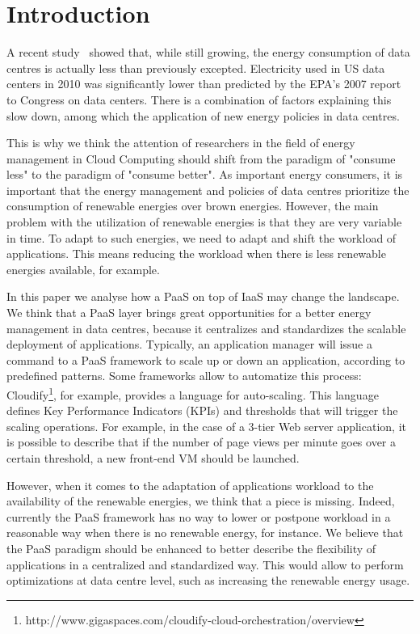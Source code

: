 \section{Introduction}
\label{sec: intro}

A recent study~\cite{koomey2011} showed that, while still growing, the energy consumption of data centres is actually less than previously excepted.
Electricity used in US data centers in 2010 was significantly lower than predicted by the EPA’s 2007 report to Congress on data centers.
There is a combination of factors explaining this slow down, among which the application of new energy policies in data centres.

This is why we think the attention of researchers in the field of energy management in Cloud Computing should shift from the paradigm of "consume less" to the paradigm of "consume better".
As important energy consumers, it is important that the energy management and policies of data centres prioritize the consumption of renewable energies over brown energies.
However, the main problem with the utilization of renewable energies is that they are very variable in time.
To adapt to such energies, we need to adapt and shift the workload of applications.
This means reducing the workload when there is less renewable energies available, for example.

In this paper we analyse how a PaaS on top of IaaS may change the landscape.
We think that a PaaS layer brings great opportunities for a better energy management in data centres, because it centralizes and standardizes the scalable deployment of applications.
Typically, an application manager will issue a command to a PaaS framework to scale up or down an application, according to predefined patterns.
Some frameworks allow to automatize this process: Cloudify\footnote{http://www.gigaspaces.com/cloudify-cloud-orchestration/overview}, for example, provides a language for auto-scaling.
This language defines Key Performance Indicators (KPIs) and thresholds that will trigger the scaling operations.
For example, in the case of a 3-tier Web server application, it is possible to describe that if the number of page views per minute goes over a certain threshold, a new front-end VM should be launched.

However, when it comes to the adaptation of applications workload to the availability of the renewable energies, we think that a piece is missing.
Indeed, currently the PaaS framework has no way to lower or postpone workload in a reasonable way when there is no renewable energy, for instance.
We believe that the PaaS paradigm should be enhanced to better describe the flexibility of applications in a centralized and standardized way.
This would allow to perform optimizations at data centre level, such as increasing the renewable energy usage.

